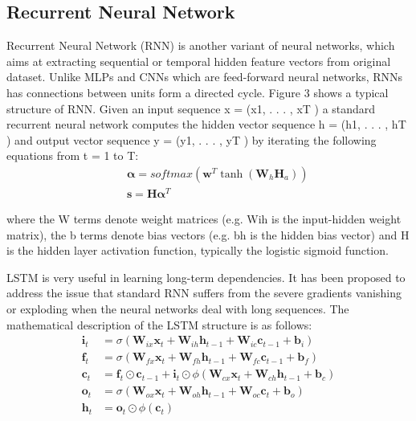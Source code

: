 \documentclass[10pt,conference,letterpaper]{IEEEtran}
\begin{document}
\subsection{Recurrent Neural Network}
Recurrent Neural Network (RNN) is another variant of neural networks, which aims at extracting  sequential or temporal hidden feature vectors from original dataset. Unlike MLPs and CNNs which are feed-forward neural networks, RNNs has connections between units form a directed cycle. Figure 3 shows a typical structure of RNN. Given an input sequence x = (x1, . . . , xT ) a standard
recurrent neural network computes the hidden vector sequence h = (h1, . . . , hT ) and output vector sequence y = (y1, . . . , yT ) by iterating the following equations from t = 1 to T:
\begin{eqnarray}
&&\mathbf{\alpha}  = softmax \left( {{\mathbf{w}^T}\tanh({\mathbf{W}_h}\mathbf{H}_a)} \right)\label{eq:9}\\
&&\mathbf{s} = \mathbf{H}{\mathbf{\alpha} ^T}\label{eq:10}
\end{eqnarray}

where the W terms denote weight matrices (e.g. Wih is the input-hidden weight matrix), the b terms denote bias vectors (e.g. bh is the hidden bias vector) and H is the hidden layer activation function, typically the logistic sigmoid function.

LSTM is very useful in learning long-term dependencies. It has been proposed to address the issue that standard RNN suffers from the severe gradients vanishing or exploding when the neural networks deal with long sequences. The mathematical description of the LSTM structure is as follows:
\begin{align}
{\mathbf{i}_t} &= \sigma \left( {{\mathbf{W}_{ix}}{\mathbf{x}_t} + {\mathbf{W}_{ih}}{\mathbf{h}_{t - 1}} + {\mathbf{W}_{ic}}{\mathbf{c}_{t - 1}} + {\mathbf{b}_i}} \right)\label{eq:1}\\
{\mathbf{f}_t} &= \sigma \left( {{\mathbf{W}_{fx}}{\mathbf{x}_t} + {\mathbf{W}_{fh}}{\mathbf{h}_{t - 1}} + {\mathbf{W}_{fc}}{\mathbf{c}_{t - 1}} + {\mathbf{b}_f}} \right)\label{eq:2}\\
{\mathbf{c}_t} &= {\mathbf{f}_t} \odot {\mathbf{c}_{t - 1}} + {\mathbf{i}_t} \odot \phi \left( {{\mathbf{W}_{cx}}{\mathbf{x}_t} + {\mathbf{W}_{ch}}{\mathbf{h}_{t - 1}} + {\mathbf{b}_c}} \right)\label{eq:123}\\
{\mathbf{o}_t} &= \sigma \left( {{\mathbf{W}_{ox}}{\mathbf{x}_t} + {\mathbf{W}_{oh}}{\mathbf{h}_{t - 1}} + {\mathbf{W}_{oc}}{\mathbf{c}_t} + {\mathbf{b}_o}} \right)\label{eq:3}\\
{\mathbf{h}_t} &= {\mathbf{o}_t} \odot \phi \left( {{\mathbf{c}_t}} \right)\label{eq:4}
\end{align}
\end{document}
